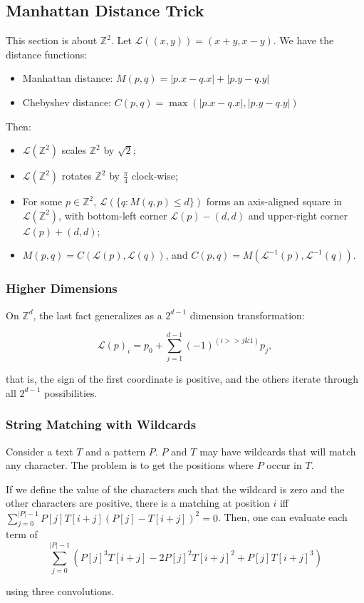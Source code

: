 \subsection{Manhattan Distance Trick}

This section is about $\mathbb Z^2$. Let $\mathcal L((x, y)) = (x+y, x-y)$. We have the distance functions:

\begin{itemize}
    \item Manhattan distance: $M(p, q) = |p.x - q.x| + |p.y - q.y|$
    \item Chebyshev distance: $C(p, q) = \max(|p.x - q.x|, |p.y - q.y|)$
\end{itemize}

Then:

\begin{itemize}
    \item $\mathcal L(\mathbb Z^2)$ scales $\mathbb Z^2$ by $\sqrt 2$;
    \item $\mathcal L(\mathbb Z^2)$ rotates $\mathbb Z^2$ by $\frac \pi 4$ clock-wise;
    \item For some $p \in \mathbb Z^2$, $\mathcal L(\{q : M(q, p) \leq d\})$ forms an axis-aligned square in $\mathcal L(\mathbb Z^2)$, with bottom-left corner $\mathcal L(p) - (d, d)$ and upper-right corner $\mathcal L(p) + (d, d)$;
    \item $M(p, q) = C(\mathcal L(p), \mathcal L(q))$, and $C(p, q) = M(\mathcal L^{-1}(p), \mathcal L^{-1}(q))$.
\end{itemize}

\subsubsection{Higher Dimensions}

On $\mathbb Z^d$, the last fact generalizes as a $2^{d-1}$ dimension transformation:

$$ \mathcal L(p)_{i} = p_0 + \sum_{j=1}^{d-1} (-1)^{(i>>j\&1)} p_j, $$

that is, the sign of the first coordinate is positive, and the others iterate through all $2^{d-1}$ possibilities.

\subsubsection{String Matching with Wildcards}


Consider a text $T$ and a pattern $P$. $P$ and $T$ may have wildcards that will match any character. The problem is to get the positions where $P$ occur in $T$.

If we define the value of the characters such that the wildcard is zero and the other characters are positive, there is a matching at position $i$ iff $\sum_{j=0}^{|P|-1}P[j]T[i+j](P[j] - T[i + j])^2 = 0$. Then, one can evaluate each term of 
$$ \sum_{j=0}^{|P|-1}(P[j]^3T[i+j] - 2P[j]^2T[i+j]^2 + P[j]T[i + j]^3) $$ 

using three convolutions.